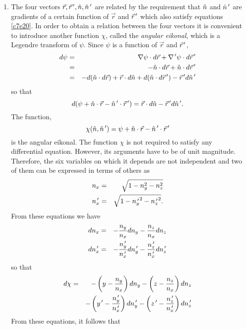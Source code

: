 \begin{enumerate}
\item The four vectors $\vec{r}, \vec{r}^{\,\prime}, \hat{n}, \hat{n}^{\,\prime}$ are related by
the requirement that $\hat{n}$ and $\hat{n}^{\,\prime}$ are gradients of a certain function
of $\vec{r}$ and $\vec{r}^{\,\prime}$ which also satisfy equations \eqref{c7e20}. In
order to obtain a relation between the four vectors it is convenient to 
introduce another function $\chi$, called the \emph{angular eikonal}, which is
a Legendre transform of $\psi$. Since $\psi$ is a function of $\vec{r}$ and
$\vec{r}^{\,\prime}$,
\begin{eqnarray*}
d\psi &=& \nabla\psi\cdot d\vec{r} + \nabla^{\,\prime}\psi\cdot d\vec{r}^{\,\prime} \\
 &=& -\hat{n}\cdot d\vec{r} + \hat{n}\cdot d\vec{r}^{\,\prime} \\
 &=& -d(\hat{n}\cdot d\vec{r}) + \vec{r}\cdot d\hat{n} + d(\hat{n}\cdot d\vec{r}^{\,\prime}) -
     \vec{r}^{\,\prime} d\hat{n}^{\,\prime}
\end{eqnarray*}
so that
\[
d(\psi + \hat{n}\cdot\vec{r} - \hat{n}^{\,\prime}\cdot\vec{r}^{\,\prime}) = 
\vec{r}\cdot d\hat{n} - \vec{r}^{\,\prime} d\hat{n}^{\,\prime}.
\]
The function,
\begin{equation}\label{c7e21}
\chi(\hat{n}, \hat{n}^{\,\prime}) = \psi + \hat{n}\cdot\vec{r} - \hat{n}^{\,\prime}\cdot\vec{r}^{\,\prime}
\end{equation}
is the angular eikonal. The function $\chi$ is not required to satisfy any
differential equation. However, its arguments have to be of unit magnitude.
Therefore, the six variables on which it depends are not independent and two
of them can be expressed in terms of others as
\begin{eqnarray}
n_x &=& \sqrt{1 - n_y^2 - n_z^2} \label{c7e22} \\
n_x^{\,\prime} &=& \sqrt{1 - {n_y^{\,\prime}}^2 - {n_z^{\,\prime}}^2} \label{c7e23}.
\end{eqnarray}
From these equations we have
\begin{eqnarray}
dn_x &=& -\frac{n_y}{n_x}dn_y - \frac{n_z}{n_x}dn_z \label{c7e24} \\
dn_x^{\,\prime} &=& -\frac{n_y^{\,\prime}}{n_x^{\,\prime}}dn_y^{\,\prime} - 
              \frac{n_z^{\,\prime}}{n_x^{\,\prime}}dn_z^{\,\prime} \label{c7e25}
\end{eqnarray}
so that 
\begin{eqnarray}
d\chi &=& -\left(y - \frac{n_y}{n_x}\right) dn_y 
  -\left(z - \frac{n_z}{n_x}\right) dn_z \nonumber \\
 & & -\left(y^{\,\prime} - \frac{n_y^{\,\prime}}{n_x^{\,\prime}}\right) dn_y^{\,\prime} 
  -\left(z^{\,\prime} - \frac{n_z^{\,\prime}}{n_x^{\,\prime}}\right) dn_z^{\,\prime} \label{c7e26}
\end{eqnarray}
From these equations, it follows that
\begin{eqnarray}

\end{eqnarray}
\end{enumerate}
